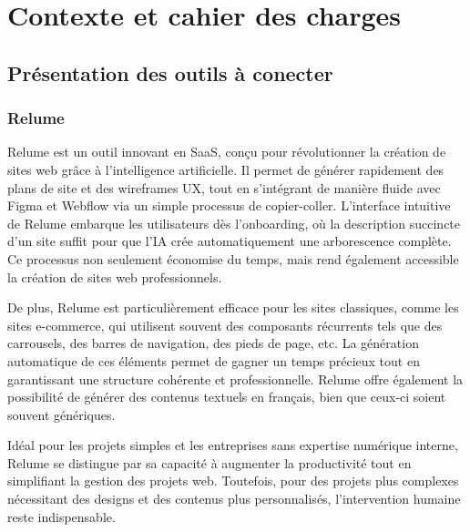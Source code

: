 \chapter{Contexte et cahier des charges}
\section{Présentation des outils à conecter}

\subsection{Relume}
Relume est un outil innovant en SaaS, conçu pour révolutionner la création de sites web grâce à l'intelligence artificielle. Il permet de générer rapidement des plans de site et des wireframes UX, tout en s'intégrant de manière fluide avec Figma et Webflow via un simple processus de copier-coller. L’interface intuitive de Relume embarque les utilisateurs dès l’onboarding, où la description succincte d’un site suffit pour que l’IA crée automatiquement une arborescence complète. Ce processus non seulement économise du temps, mais rend également accessible la création de sites web professionnels.

De plus, Relume est particulièrement efficace pour les sites classiques, comme les sites e-commerce, qui utilisent souvent des composants récurrents tels que des carrousels, des barres de navigation, des pieds de page, etc. La génération automatique de ces éléments permet de gagner un temps précieux tout en garantissant une structure cohérente et professionnelle. Relume offre également la possibilité de générer des contenus textuels en français, bien que ceux-ci soient souvent génériques.

Idéal pour les projets simples et les entreprises sans expertise numérique interne, Relume se distingue par sa capacité à augmenter la productivité tout en simplifiant la gestion des projets web. Toutefois, pour des projets plus complexes nécessitant des designs et des contenus plus personnalisés, l’intervention humaine reste indispensable. 